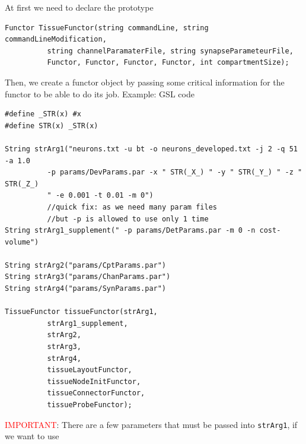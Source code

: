 At first we need to declare the prototype
\begin{verbatim}
Functor TissueFunctor(string commandLine, string commandLineModification, 
          string channelParamaterFile, string synapseParameteurFile,
          Functor, Functor, Functor, Functor, int compartmentSize);

\end{verbatim}

Then, we create a functor object by passing some critical information for the
functor to be able to do its job. Example: GSL code
{\tiny
\begin{verbatim}
#define _STR(x) #x 
#define STR(x) _STR(x)

String strArg1("neurons.txt -u bt -o neurons_developed.txt -j 2 -q 51 -a 1.0 
          -p params/DevParams.par -x " STR(_X_) " -y " STR(_Y_) " -z " STR(_Z_) 
          " -e 0.001 -t 0.01 -m 0")
          //quick fix: as we need many param files
          //but -p is allowed to use only 1 time
String strArg1_supplement(" -p params/DetParams.par -m 0 -n cost-volume")
          
String strArg2("params/CptParams.par")
String strArg3("params/ChanParams.par")          
String strArg4("params/SynParams.par")

TissueFunctor tissueFunctor(strArg1,
          strArg1_supplement, 
          strArg2,
          strArg3,
          strArg4, 
          tissueLayoutFunctor,
          tissueNodeInitFunctor, 
          tissueConnectorFunctor, 
          tissueProbeFunctor);
\end{verbatim}
}

\textcolor{red}{IMPORTANT}: There are a few parameters that must be passed into
\verb!strArg1!, if we want to use

